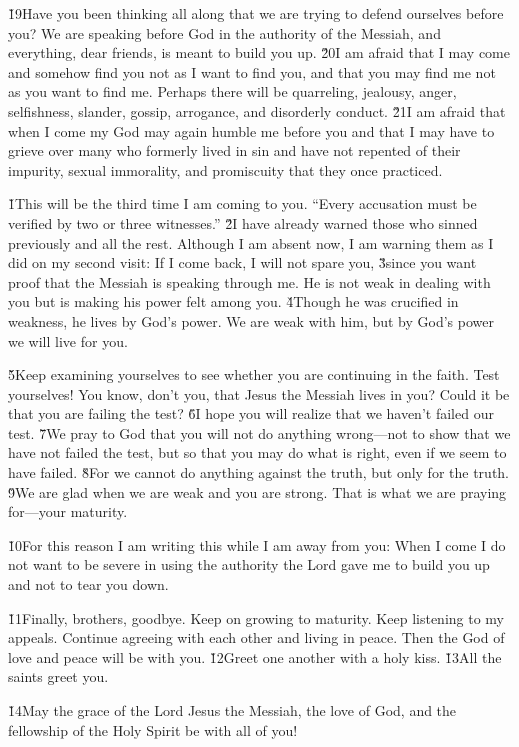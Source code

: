 \v{19}Have you been thinking all along that we are trying to defend ourselves before you? We are speaking before God in the authority of the Messiah, and everything, dear friends, is meant to build you up. \v{20}I am afraid that I may come and somehow find you not as I want to find you, and that you may find me not as you want to find me. Perhaps there will be quarreling, jealousy, anger, selfishness, slander, gossip, arrogance, and disorderly conduct. \v{21}I am afraid that when I come my God may again humble me before you and that I may have to grieve over many who formerly lived in sin and have not repented of their impurity, sexual immorality, and promiscuity that they once practiced.

\v{1}This will be the third time I am coming to you. ``Every accusation must be verified by two or three witnesses.'' \v{2}I have already warned those who sinned previously and all the rest. Although I am absent now, I am warning them as I did on my second visit: If I come back, I will not spare you, \v{3}since you want proof that the Messiah is speaking through me. He is not weak in dealing with you but is making his power felt among you. \v{4}Though he was crucified in weakness, he lives by God's power. We are weak with him, but by God's power we will live for you.

\v{5}Keep examining yourselves to see whether you are continuing in the faith. Test yourselves! You know, don't you, that Jesus the Messiah lives in you? Could it be that you are failing the test? \v{6}I hope you will realize that we haven't failed our test. \v{7}We pray to God that you will not do anything wrong---not to show that we have not failed the test, but so that you may do what is right, even if we seem to have failed. \v{8}For we cannot do anything against the truth, but only for the truth. \v{9}We are glad when we are weak and you are strong. That is what we are praying for---your maturity.

\v{10}For this reason I am writing this while I am away from you: When I come I do not want to be severe in using the authority the Lord gave me to build you up and not to tear you down.

\v{11}Finally, brothers, goodbye. Keep on growing to maturity. Keep listening to my appeals. Continue agreeing with each other and living in peace. Then the God of love and peace will be with you. \v{12}Greet one another with a holy kiss. \v{13}All the saints greet you.

\v{14}May the grace of the Lord Jesus the Messiah, the love of God, and the fellowship of the Holy Spirit be with all of you!
